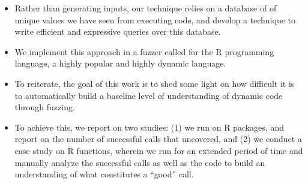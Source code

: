 \begin{itemize}
    \item Rather than generating inputs, our technique relies on a database of  of unique values we have seen from executing code, and develop a technique to write efficient and expressive queries over this database.
    \item We implement this approach in a fuzzer called \tool for the R programming language, a highly popular and highly dynamic language.
    \item To reiterate, the goal of this work is to shed some light on how difficult it is to automatically build a baseline level of understanding of dynamic code through fuzzing.
    \item To achieve this, we report on two studies: (1) we run \tool on \numPkgsScaleStudy R packages, and report on the number of successful calls that \tool uncovered, and (2) we conduct a case study on \numFnsCaseStudy R functions, wherein we run \tool for an extended period of time and manually analyze the successful calls as well as the code to build an understanding of what constitutes a ``good'' call.
\end{itemize}